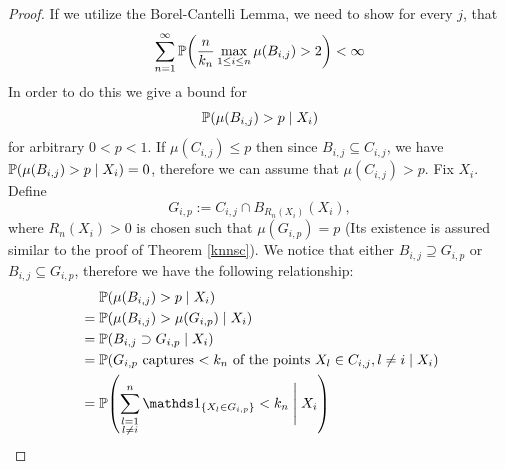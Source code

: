 \begin{proof}
    If we utilize the Borel-Cantelli Lemma, we need to show for every \(j\), that
    \[
        \sum_{n=1}^\infty \pro{\frac{n}{k_n}\max_{1 \leq i \leq n} \mu(B_{i, j}) > 2} < \infty
    \]
    In order to do this we give a bound for
    \[
        \mathbb{P}\!\left(\mu(B_{i,j}) > p \mid X_i\right)
    \]
    for arbitrary \(0 < p < 1\). If \(\mu(C_{i, j}) \leq p\) then since \(B_{i, j} \subseteq C_{i, j}\), we have \(\mathbb{P}\!\left(\mu(B_{i,j}) > p \mid X_i\right) = 0\), therefore we can assume that \(\mu(C_{i, j}) > p\). Fix \(X_i\). Define
    \[
        G_{i, p} := C_{i, j} \cap B_{R_n(X_i)}(X_i),
    \]
    where \(R_n(X_i) > 0\) is chosen such that \(\mu(G_{i, p}) = p\) (Its existence is assured similar to the proof of Theorem \ref{knnsc}). We notice that either
    \(B_{i, j} \supseteq G_{i, p}\) or \(B_{i, j} \subseteq G_{i, p}\), therefore we have the following relationship:
    \begin{align*}
        &\quad \ \pro{\mu(B_{i, j}) > p \mid X_i} \\
        &= \pro{\mu(B_{i, j}) > \mu(G_{i, p}) \mid X_i} \\
        &= \pro{B_{i, j} \supset G_{i, p} \mid X_i} \\
        &= \pro{\text{\(G_{i, p}\) captures \(< k_n\) of the points} \ X_l \in C_{i, j}, l \neq i \mid X_i} \\
        &= \pro{\sum_{\substack{l = 1 \\ l \neq i}}^n \ind{\{X_l \in G_{i, p}\}} < k_n \Biggm| X_i}
    \end{align*}



\end{proof}

